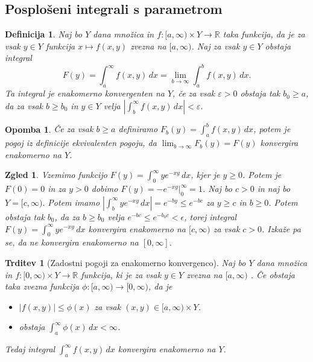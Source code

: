 \documentclass[10pt, a4paper]{article}
\newtheorem{trditev}[izr]{Trditev}
\newtheorem{defi}{Definicija}[section]
\newenvironment{noticeB}{%
  \tcolorbox[%
  notitle,
  empty,
  enhanced,  %
  breakable,
  coltext=black,
  colback=white, 
  fontupper=\rmfamily,
  parbox=false,
  noparskip,
  sharp corners,
  boxrule=-1pt,  %
  frame hidden,
  left=7pt,  %
  right=7pt,
  top=5pt,
  bottom=5pt,
  before skip=2.5ex plus 2pt,
  after skip=2.5ex plus 2pt,
  borderline west = {1.5pt}{-0.1pt}{blue!30!black}, %
  overlay unbroken and last={%
    \draw[color=black, line width=1.25pt]
    ($(frame.south west)+(1.pt, -0.1pt)$) -- ++(2em, 0);
  }
  ]}
{\endtcolorbox}
\newenvironment{definicija}{\begin{defi}\begin{noticeB}}{%
    \end{noticeB}\end{defi}}
\newtheorem*{opomba}{Opomba}
\newtheorem{zgled}{Zgled}[section]
\newcommand{\R}{\mathbb {R}}
\begin{document}
\subsection{Posplošeni integrali s parametrom}

\begin{definicija}
    Naj bo $Y$ dana množica in $f: [a, \infty) \times Y \to \R$ taka funkcija, da je za vsak $y \in Y$
    funkcija $x \mapsto f(x, y)$ zvezna na $[a, \infty)$. Naj za vsak $y \in Y$ 
    obstaja integral 
    $$F(y) = \int_a ^\infty f(x, y)\, dx = \lim_{b \to \infty} \int_a ^b f(x, y)\, dx.$$
    Ta integral je enakomerno konvergenten na $Y$, če za vsak $\varepsilon > 0$ obstaja tak $b_0 \geq a$,
    da za vsak $b \geq b_0$ in $y \in Y$ velja $\left| \int_b ^\infty f(x, y)\, dx \right| < \varepsilon$.
\end{definicija}

\begin{opomba}
    Če za vsak $ b \geq a$ definiramo $F_b (y) = \int_a ^b f(x, y) \, dx$,
    potem je pogoj iz definicije ekvivalenten pogoju, da $\lim_{b \to \infty} F_b (y) = F(y)$
    konvergira enakomerno na $Y$.
\end{opomba}

\begin{zgled}
    Vzemimo funkcijo $F(y) = \int_0 ^\infty y e^{-xy}\, dx$, kjer je $y \geq 0$.
    Potem je $F(0) = 0$ in za $y > 0$ dobimo $F(y) = -e^{-xy} \big|_0 ^\infty = 1$.
    Naj bo $c > 0$ in naj bo $Y = [c, \infty).$
    Potem imamo $\left| \int_b ^\infty y e^{-xy}\, dx \right| = e^{-by} \leq e^{-bc}$ za $y \geq c$ in $b \geq 0$.
    Potem obstaja tak $b_0$, da za $b \geq b_0$ velja $e^{-bc} \leq e^{-b_0 c} < \epsilon$,
    torej integral $F(y) = \int_0 ^\infty y e^{-xy}\, dx$ konvergira enakomerno na $[c, \infty)$ za vsak $c > 0$.
    Izkaže pa se, da ne konvergira enakomerno na $[0, \infty]$.
\end{zgled}

\begin{trditev}[Zadostni pogoji za enakomerno konvergenco]
    Naj bo $Y$ dana množica in $f:[0, \infty) \times Y \to \R$
    funkcija, ki je za vsak $y \in Y$ zvezna na $[a, \infty)$ .
    Če obstaja taka zvezna funkcija $\phi: [a, \infty) \to [0, \infty)$, da je 
    \begin{itemize}
        \item $|f(x, y)| \leq \phi(x)$ za vsak $(x, y) \in [a, \infty) \times Y$.
        \item obstaja $\int_a ^\infty \phi(x)\,dx < \infty$.
    \end{itemize}
    Tedaj integral $\int_a ^\infty f(x, y)\, dx$ konvergira enakomerno na $Y$.
\end{trditev}
\end{document}
